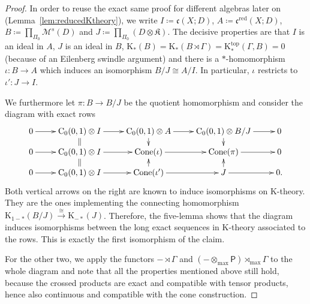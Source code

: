 \documentclass[pdftex]{sigma}
\numberwithin{equation}{section}
\theoremstyle{definition}
\newcommand{\Ct}{\mathrm{C}}
\newcommand{\Cz}{\Ct_0}
\DeclareMathOperator{\Cone}{Cone}
\newcommand{\maxtensor}{\mathbin{{\otimes}_{\mathrm{max}}}}
\newcommand{\maxcrossed}{\mathbin{{\rtimes}_{\mathrm{max}}}}
\newcommand{\K}{\mathrm{K}}
\newcommand{\Ktop}{\mathrm{K}^{\mathrm{top}}}
\newcommand{\sHigCor}{\mathfrak{c}}
\newcommand{\sHigCorRed}{\mathfrak{c}^{\mathrm{red}}}
\newcommand{\Kom}{{\mathfrak{K}}}
\newcommand{\multiplier}{{\mathcal{M}}}
\newcommand{\sfP}{\mathsf{P}}
\newcommand{\blank}{-}
\newcommand{\coarsecomp}{\Pi_0}
\begin{document}
\begin{proof}
In order to reuse the exact same proof for different algebras later on (Lemma~\ref{lem:reducedKtheory}), we write $I\coloneqq\sHigCor(X;D)$, $A\coloneqq\sHigCorRed(X;D)$, $B\coloneqq\prod_{\coarsecomp}\multiplier^s(D)$ and $J\coloneqq \prod_{\coarsecomp} (D\otimes \Kom)$. The decisive properties are that $I$ is an ideal in $A$, $J$ is an ideal in $B$, $\K_*(B)=\K_*(B\rtimes \Gamma)=\Ktop_*(\Gamma,B)=0$ (because of an Eilenberg swindle argument) and there is a $*$-homomorphism $\iota\colon B\to A$ which induces an isomorphism $B/J\cong A/I$. In particular, $\iota$ restricts to $\iota'\colon J\to I$.

We furthermore let $\pi\colon B\to B/J$ be the quotient homomorphism and consider the diagram with exact rows
\[
\xymatrix@R=2ex{
0\ar[r]& \Cz(0,1)\otimes I\ar[r]\ar@{=}[d]& \Cz(0,1)\otimes A\ar[r]\ar[d]& \Cz(0,1)\otimes B/J\ar[r]\ar[d]&0
\\0\ar[r]& \Cz(0,1)\otimes I\ar[r]\ar@{=}[d]& \Cone(\iota)\ar[r]&\Cone(\pi)\ar[r]&0
\\0\ar[r]& \Cz(0,1)\otimes I\ar[r]& \Cone(\iota')\ar[u] \ar[r]& J\ar[u]\ar[r]&0.
}
\]
Both vertical arrows on the right are known to induce isomorphisms on $\K$-theory. They are the ones implementing the connecting homomorphism
$\K_{1-*}(B/J)\xrightarrow{\cong}\K_{-*}(J)$.
Therefore, the five-lemma shows that the diagram induces isomorphisms between the long exact sequences in $\K$-theory associated to the rows.
This is exactly the first isomorphism of the claim.

For the other two, we apply the functors $\blank\rtimes\Gamma$ and $(\blank\maxtensor\sfP)\maxcrossed\Gamma$ to the whole diagram and note that all the properties mentioned above still hold, because the crossed products are exact and compatible with tensor products, hence also continuous and compatible with the cone construction.
\end{proof}
\end{document}
